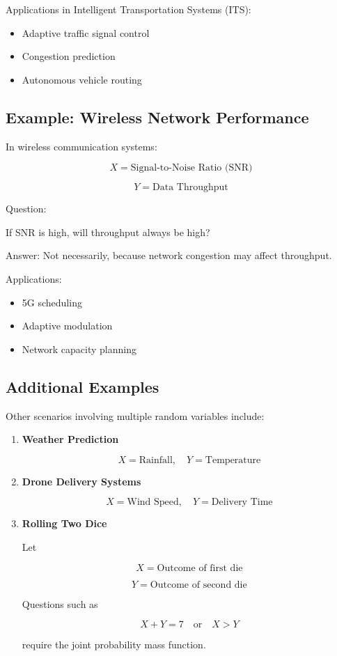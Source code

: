 \documentclass[12pt]{article}
\begin{document}
Applications in Intelligent Transportation Systems (ITS):

\begin{itemize}
\item Adaptive traffic signal control
\item Congestion prediction
\item Autonomous vehicle routing
\end{itemize}

\subsection{Example: Wireless Network Performance}

In wireless communication systems:

\[
X = \text{Signal-to-Noise Ratio (SNR)}
\]

\[
Y = \text{Data Throughput}
\]

Question:

If SNR is high, will throughput always be high?

Answer: Not necessarily, because network congestion may affect throughput.

Applications:

\begin{itemize}
\item 5G scheduling
\item Adaptive modulation
\item Network capacity planning
\end{itemize}

\subsection{Additional Examples}

Other scenarios involving multiple random variables include:

\begin{enumerate}
\item \textbf{Weather Prediction}

\[
X = \text{Rainfall}, \quad Y = \text{Temperature}
\]

\item \textbf{Drone Delivery Systems}

\[
X = \text{Wind Speed}, \quad Y = \text{Delivery Time}
\]

\item \textbf{Rolling Two Dice}

Let

\[
X = \text{Outcome of first die}
\]

\[
Y = \text{Outcome of second die}
\]

Questions such as

\[
X + Y = 7 \quad \text{or} \quad X > Y
\]

require the joint probability mass function.

\end{enumerate}
\end{document}
